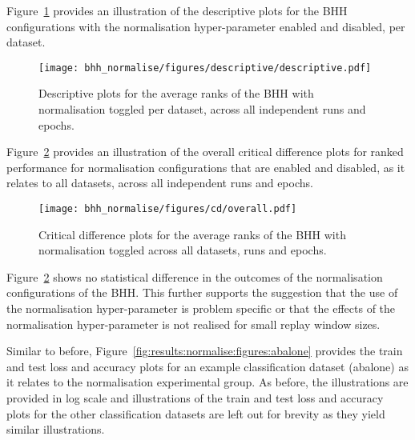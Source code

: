 Figure~\ref{fig:results:normalise:descriptive:descriptive} provides an illustration of the descriptive plots for the \acs{BHH} configurations with the normalisation hyper-parameter enabled and disabled, per dataset.

\begin{figure}[htb]
      \centering
      \texttt{[image: bhh\_normalise/figures/descriptive/descriptive.pdf]}
      \caption{Descriptive plots for the average ranks of the \acs{BHH} with normalisation toggled per dataset, across all independent runs and epochs.}
      \label{fig:results:normalise:descriptive:descriptive}
\end{figure}

Figure~\ref{fig:results:normalise:descriptive:cd} provides an illustration of the overall critical difference plots for ranked performance for normalisation configurations that are enabled and disabled, as it relates to all datasets, across all independent runs and epochs.

\begin{figure}[htb]
      \centering
      \texttt{[image: bhh\_normalise/figures/cd/overall.pdf]}
      \caption{Critical difference plots for the average ranks of the \acs{BHH} with normalisation toggled across all datasets, runs and epochs.}
      \label{fig:results:normalise:descriptive:cd}
\end{figure}

Figure~\ref{fig:results:normalise:descriptive:cd} shows no statistical difference in the outcomes of the normalisation configurations of the \acs{BHH}. This further supports the suggestion that the use of the normalisation hyper-parameter is problem specific or that the effects of the normalisation hyper-parameter is not realised for small replay window sizes.

Similar to before, Figure~\ref{fig:results:normalise:figures:abalone} provides the train and test loss and accuracy plots for an example classification dataset (abalone) as it relates to the normalisation experimental group. As before, the illustrations are provided in log scale and illustrations of the train and test loss and accuracy plots for the other classification datasets are left out for brevity as they yield similar illustrations.

